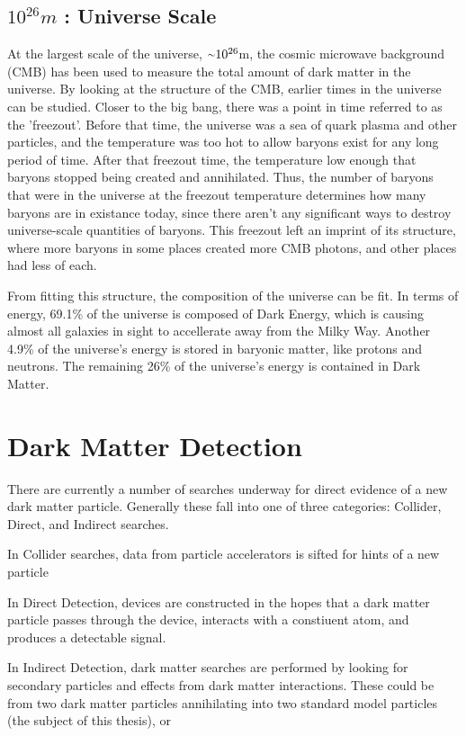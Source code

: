 \subsection{$10^{26}m$ : Universe Scale}
%
At the largest scale of the universe, $\nicetilde 10^{26}$m, the cosmic microwave background (CMB) has been used to measure the total amount of dark matter in the universe.
By looking at the structure of the CMB, earlier times in the universe can be studied.
Closer to the big bang, there was a point in time referred to as the 'freezout'.
Before that time, the universe was a sea of quark plasma and other particles, and the temperature was too hot to allow baryons exist for any long period of time.
After that freezout time, the temperature low enough that baryons stopped being created and annihilated.
Thus, the number of baryons that were in the universe at the freezout temperature determines how many baryons are in existance today, since there aren't any significant ways to destroy universe-scale quantities of baryons.
This freezout left an imprint of its structure, where more baryons in some places created more CMB photons, and other places had less of each.

From fitting this structure, the composition of the universe can be fit.
In terms of energy, 69.1\% of the universe is composed of Dark Energy, which is causing almost all galaxies in sight to accellerate away from the Milky Way.
Another 4.9\% of the universe's energy is stored in baryonic matter, like protons and neutrons.
The remaining 26\% of the universe's energy is contained in Dark Matter\cite{planck2015}.


\section{Dark Matter Detection}

There are currently a number of searches underway for direct evidence of a new dark matter particle.
Generally these fall into one of three categories: Collider, Direct, and Indirect searches.

In Collider searches, data from particle accelerators is sifted for hints of a new particle

In Direct Detection, devices are constructed in the hopes that a dark matter particle passes through the device, interacts with a constiuent atom, and produces a detectable signal.

In Indirect Detection, dark matter searches are performed by looking for secondary particles and effects from dark matter interactions.
These could be from two dark matter particles annihilating into two standard model particles (the subject of this thesis), or 





